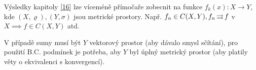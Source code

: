\begin{poznamka}
  Výsledky kapitoly \ref{16} lze víceméně přímočaře zobecnit na funkce $f_k(x) \colon X \to Y$, kde $(X, \varrho), (Y, \sigma)$ jsou metrické prostory. Např. $f_n \in C(X, Y), f_n \operatorname{\rightrightarrows} f$ v $X\implies f \in C(X, Y)$ atd.

  V případě sumy musí být $Y$ vektorový prostor (aby dávalo smysl sčítání), pro použití B.C. podmínek je potřeba, aby $Y$ byl úplný metrický prostor (aby platily věty o ekvivalenci s konvergencí).
\end{poznamka}
